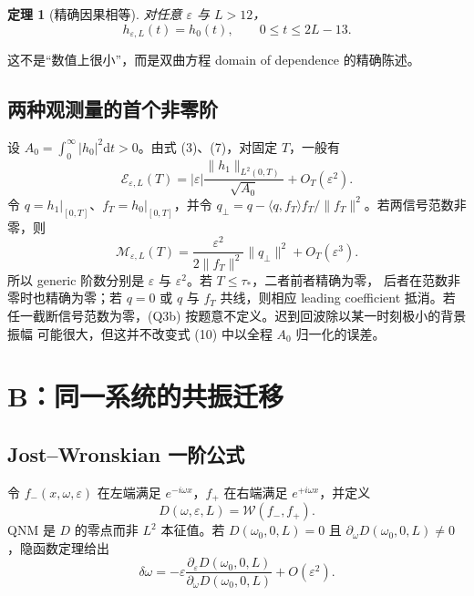 \documentclass[UTF8,11pt,a4paper]{ctexart}
\newtheorem{theorem}{定理}[section]
\theoremstyle{definition}
\newcommand{\E}{\mathcal E}
\newcommand{\M}{\mathcal M}
\newcommand{\norm}[1]{\lVert#1\rVert}
\newcommand{\ip}[2]{\langle#1,#2\rangle}
\newcommand{\dd}{\mathrm d}
\newcommand{\eps}{\varepsilon}
\newcommand{\om}{\omega}
\begin{document}
\begin{theorem}[精确因果相等]
对任意 $\eps$ 与 $L>12$，
\begin{equation}
h_{\eps,L}(t)=h_0(t),\qquad 0\le t\le2L-13.                 \tag{9}
\end{equation}
\end{theorem}

这不是“数值上很小”，而是双曲方程 domain of dependence 的精确陈述。

\subsection{两种观测量的首个非零阶}

设 $A_0=\int_0^\infty|h_0|^2\dd t>0$。由式 (3)、(7)，对固定 $T$，一般有
\begin{equation}
\E_{\eps,L}(T)=
|\eps|\frac{\norm{h_1}_{L^2(0,T)}}{\sqrt{A_0}}+O_T(\eps^2). \tag{10}
\end{equation}
令 $q=h_1|_{[0,T]}$、$f_T=h_0|_{[0,T]}$，并令
$q_\perp=q-\ip{q}{f_T}f_T/\norm{f_T}^2$。若两信号范数非零，则
\begin{equation}
\M_{\eps,L}(T)=
\frac{\eps^2}{2\norm{f_T}^2}\norm{q_\perp}^2+O_T(\eps^3). \tag{11}
\end{equation}
所以 generic 阶数分别是 $\eps$ 与 $\eps^2$。若 $T\le\tau_*$，二者前者精确为零，
后者在范数非零时也精确为零；若 $q=0$ 或 $q$ 与 $f_T$ 共线，则相应 leading coefficient
抵消。若任一截断信号范数为零，(Q3b) 按题意不定义。迟到回波除以某一时刻极小的背景振幅
可能很大，但这并不改变式 (10) 中以全程 $A_0$ 归一化的误差。

\section{B：同一系统的共振迁移}

\subsection{Jost--Wronskian 一阶公式}

令 $f_-(x,\om,\eps)$ 在左端满足 $e^{-i\om x}$，$f_+$ 在右端满足
$e^{+i\om x}$，并定义
\[
D(\om,\eps,L)=\mathcal W(f_-,f_+).
\]
QNM 是 $D$ 的零点而非 $L^2$ 本征值。若 $D(\om_0,0,L)=0$ 且
$\partial_\om D(\om_0,0,L)\ne0$，隐函数定理给出
\begin{equation}
\delta\om=-\eps\frac{\partial_\eps D(\om_0,0,L)}
{\partial_\om D(\om_0,0,L)}+O(\eps^2).                    \tag{12}
\end{equation}
\end{document}
